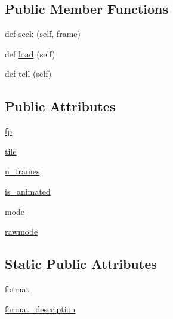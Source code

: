 \subsection*{Public Member Functions}
\begin{DoxyCompactItemize}
\item 
def \hyperlink{classPIL_1_1WebPImagePlugin_1_1WebPImageFile_ad5bf16dbdc311c8edcd919e33515f22e}{seek} (self, frame)
\item 
def \hyperlink{classPIL_1_1WebPImagePlugin_1_1WebPImageFile_a4ffedda428676dde8f544b686eeee789}{load} (self)
\item 
def \hyperlink{classPIL_1_1WebPImagePlugin_1_1WebPImageFile_a3717e7e236e59e395aa1ad608ab1aeff}{tell} (self)
\end{DoxyCompactItemize}
\subsection*{Public Attributes}
\begin{DoxyCompactItemize}
\item 
\hyperlink{classPIL_1_1WebPImagePlugin_1_1WebPImageFile_adee5de849b5d096eb41e42ef928d958d}{fp}
\item 
\hyperlink{classPIL_1_1WebPImagePlugin_1_1WebPImageFile_a07e93ef2fa01223213e38e439cf2a824}{tile}
\item 
\hyperlink{classPIL_1_1WebPImagePlugin_1_1WebPImageFile_a40dbeb1a00b6bc6b96c0ee072f06474e}{n\+\_\+frames}
\item 
\hyperlink{classPIL_1_1WebPImagePlugin_1_1WebPImageFile_a576a729e8e393fab5183aa8ad02629ab}{is\+\_\+animated}
\item 
\hyperlink{classPIL_1_1WebPImagePlugin_1_1WebPImageFile_a5d0723d0f149fc802f26369e40323477}{mode}
\item 
\hyperlink{classPIL_1_1WebPImagePlugin_1_1WebPImageFile_a4ebe17da8643f029bef727cbafb0fe77}{rawmode}
\end{DoxyCompactItemize}
\subsection*{Static Public Attributes}
\begin{DoxyCompactItemize}
\item 
\hyperlink{classPIL_1_1WebPImagePlugin_1_1WebPImageFile_ae6a016cb72fb042b51690133cdd05551}{format}
\item 
\hyperlink{classPIL_1_1WebPImagePlugin_1_1WebPImageFile_afdd46f5258b1214e4be75e9f1284ee8d}{format\+\_\+description}
\end{DoxyCompactItemize}


